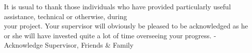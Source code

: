 It is usual to thank those individuals who have provided particularly useful assistance, technical or otherwise, during\\ your project. Your supervisor will obviously be pleased to be acknowledged as he or she will have invested quite a lot of time overseeing your progress.
-Acknowledge Supervisor, Friends \& Family